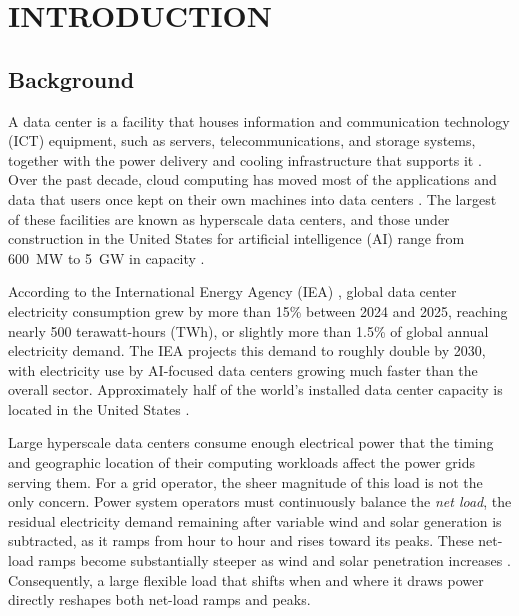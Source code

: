 \documentclass{UNCC-thesis}
\begin{document}
\clearpage
{}
\bodychapterformat

\chapter{INTRODUCTION}
\label{chap:introduction}

\section{Background}
\label{sec:intro-background}

A data center is a facility that houses information and communication technology (ICT)
equipment, such as servers, telecommunications, and storage systems, together with the power
delivery and cooling infrastructure that supports it \cite{vasques2019review}. Over the past
decade, cloud computing has moved most of the applications and data that users once kept on their
own machines into data centers \cite{katal2023energy}. The largest of these facilities are known as
hyperscale data centers, and those under construction in the United States for artificial
intelligence (AI) range from 600~MW to 5~GW in capacity \cite{iea2026energyai}.

According to the International Energy Agency (IEA) \cite{iea2026energyai}, global data center
electricity consumption grew by more than 15\% between 2024 and 2025, reaching nearly
500 terawatt-hours (TWh), or slightly more than 1.5\% of global annual electricity demand. The
IEA projects this demand to roughly double by 2030, with electricity use by AI-focused data
centers growing much faster than the overall sector. Approximately half of the world's installed
data center capacity is located in the United States \cite{iea2026energyai}.

Large hyperscale data centers consume enough electrical power that the timing and geographic
location of their computing workloads affect the power grids serving them. For a grid operator,
the sheer magnitude of this load is not the only concern. Power system operators must
continuously balance the \emph{net load}, the residual electricity demand remaining after
variable wind and solar generation is subtracted, as it ramps from hour to hour and rises toward
its peaks. These net-load ramps become substantially steeper as wind and solar penetration
increases \cite{lannoye2012assessment,eia2023duckcurve}. Consequently, a large flexible load that
shifts when and where it draws power directly reshapes both net-load ramps and peaks.
\end{document}
